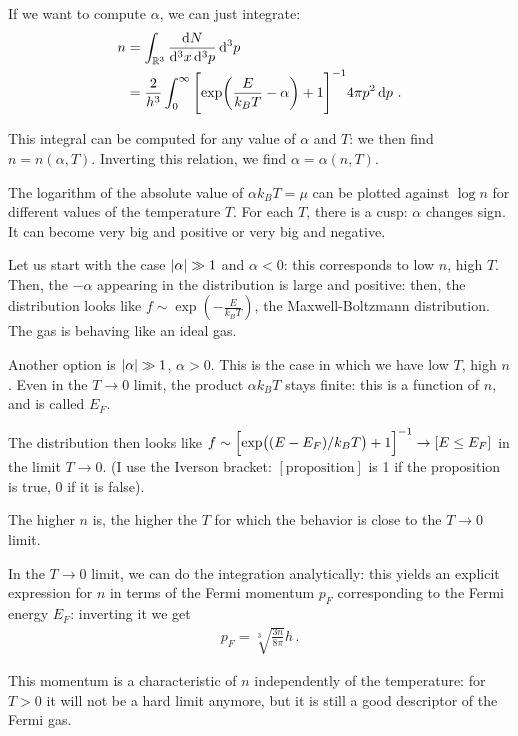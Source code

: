 \documentclass[main.tex]{subfiles}
\begin{document}
If we want to compute \(\alpha \), we can just integrate: 
%
\begin{align}
n &= \int_{\mathbb{R}^3} \frac{ \dd{N}}{ \dd[3]{x} \dd[3]{p}} \dd[3]{p}  \\
&= \frac{2}{h^3} \int_0^{\infty } 
\qty[\exp(\frac{E }{k_B T} - \alpha ) + 1]^{-1} 4 \pi p^2 \dd{p}
\,.
\end{align}

This integral can be computed for any value of \(\alpha \) and \(T\): we then find \(n = n(\alpha , T)\). Inverting this relation, we find \(\alpha = \alpha (n, T)\). 

The logarithm of the absolute value of \(\alpha k_B T = \mu \) can be plotted against \(\log n\) for different values of the temperature \(T\). For each \(T\), there is a cusp: \(\alpha \) changes sign. It can become very big and positive or very big and negative. 


Let us start with the case \(\abs{\alpha } \gg 1 \) and \(\alpha < 0\): this corresponds to low \(n\), high \(T\). 
Then, the \(- \alpha \) appearing in the distribution is large and positive: then, the distribution looks like \(f \sim \exp(- \frac{E}{k_B T})\), the Maxwell-Boltzmann distribution. 
The gas is behaving like an ideal gas. 

Another option is \(\abs{\alpha } \gg 1\), \(\alpha > 0\). This is the case in which we have low \(T\), high \(n\). Even in the \(T \to 0\) limit, the product \(\alpha k_B T \) stays finite: this is a function of \(n\), and is called \(E _F\).

The distribution then looks like \(f \sim \qty[\exp( (E - E_F) / k_B T) + 1]^{-1} \to [E \leq E_F]\) in the limit \(T \to 0\).
(I use the Iverson bracket: \([\text{proposition}]\) is 1 if the proposition is true, 0 if it is false).  

The higher \(n\) is, the higher the \(T\) for which the behavior is close to the \(T \to 0\) limit. 

In the \(T \to 0\) limit, we can do the integration analytically: this yields an explicit expression for \(n\) in terms of the Fermi momentum \(p_F\) corresponding to the Fermi energy \(E_F\): inverting it we get
%
\begin{align}
p_F = \sqrt[3]{\frac{3n }{8 \pi }} h
\,.
\end{align}

This momentum is a characteristic of \(n\) independently of the temperature: for \(T > 0\) it will not be a hard limit anymore, but it is still a good descriptor of the Fermi gas. 
\end{document}
